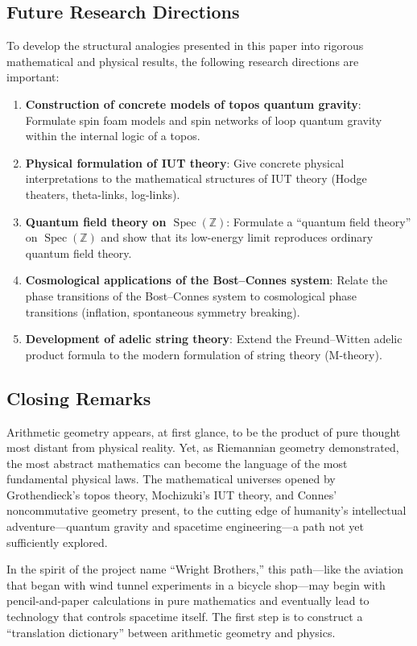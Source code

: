 \documentclass[12pt,a4paper]{article}
\theoremstyle{definition}
\newcommand{\Spec}{\operatorname{Spec}}
\begin{document}
\subsection{Future Research Directions}

To develop the structural analogies presented in this paper into rigorous mathematical and physical results, the following research directions are important:

\begin{enumerate}[leftmargin=2em]
  \item \textbf{Construction of concrete models of topos quantum gravity}: Formulate spin foam models and spin networks of loop quantum gravity \cite{Rovelli2004} within the internal logic of a topos.
  \item \textbf{Physical formulation of IUT theory}: Give concrete physical interpretations to the mathematical structures of IUT theory (Hodge theaters, theta-links, log-links).
  \item \textbf{Quantum field theory on $\Spec(\mathbb{Z})$}: Formulate a ``quantum field theory'' on $\Spec(\mathbb{Z})$ and show that its low-energy limit reproduces ordinary quantum field theory.
  \item \textbf{Cosmological applications of the Bost--Connes system}: Relate the phase transitions of the Bost--Connes system to cosmological phase transitions (inflation, spontaneous symmetry breaking).
  \item \textbf{Development of adelic string theory}: Extend the Freund--Witten adelic product formula to the modern formulation of string theory (M-theory).
\end{enumerate}

\subsection{Closing Remarks}

Arithmetic geometry appears, at first glance, to be the product of pure thought most distant from physical reality. Yet, as Riemannian geometry demonstrated, the most abstract mathematics can become the language of the most fundamental physical laws. The mathematical universes opened by Grothendieck's topos theory, Mochizuki's IUT theory, and Connes' noncommutative geometry present, to the cutting edge of humanity's intellectual adventure---quantum gravity and spacetime engineering---a path not yet sufficiently explored.

In the spirit of the project name ``Wright Brothers,'' this path---like the aviation that began with wind tunnel experiments in a bicycle shop---may begin with pencil-and-paper calculations in pure mathematics and eventually lead to technology that controls spacetime itself. The first step is to construct a ``translation dictionary'' between arithmetic geometry and physics.
\end{document}

